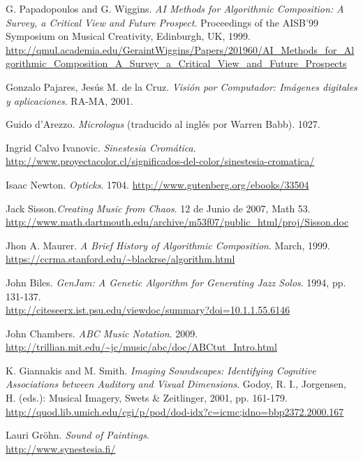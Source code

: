 \begin{thebibliography}{9}
 G. Papadopoulos and G. Wiggins. \emph{AI Methods for Algorithmic Composition: A Survey, a Critical View  and Future Prospect}. Proceedings of the AISB’99 Symposium on Musical Creativity, Edinburgh, UK, 1999.\\
 \url{http://qmul.academia.edu/GeraintWiggins/Papers/201960/AI_Methods_for_Algorithmic_Composition_A_Survey_a_Critical_View_and_Future_Prospects}

 Gonzalo Pajares, Jesús M. de la Cruz. \emph{Visión por Computador: Imágenes digitales y aplicaciones}. RA-MA, 2001.

 Guido d'Arezzo. \emph{Micrologus} (traducido al inglés por Warren Babb). 1027.

 Ingrid Calvo Ivanovic. \emph{Sinestesia Cromática}.
 \url{http://www.proyectacolor.cl/significados-del-color/sinestesia-cromatica/}

 Isaac Newton. \emph{Opticks}. 1704.
 \url{http://www.gutenberg.org/ebooks/33504}

Jack Sisson.\emph{Creating Music from Chaos}. 12 de Junio de 2007, Math 53.\\
\url{http://www.math.dartmouth.edu/archive/m53f07/public_html/proj/Sisson.doc}

 Jhon A. Maurer. \emph{A Brief History of Algorithmic Composition}. March, 1999.\\
 \url{https://ccrma.stanford.edu/~blackrse/algorithm.html}

 John Biles. \emph{GenJam: A Genetic Algorithm for Generating Jazz Solos}. 1994, pp. 131-137.\\
 \url{http://citeseerx.ist.psu.edu/viewdoc/summary?doi=10.1.1.55.6146}

  John Chambers. \emph{ABC Music Notation}. 2009.\\
  \url{http://trillian.mit.edu/~jc/music/abc/doc/ABCtut_Intro.html}
 
 K. Giannakis and M. Smith. \emph{Imaging Soundscapes: Identifying Cognitive Associations between Auditory and Visual Dimensions}. Godoy, R. I., Jorgensen, H. (eds.): Musical Imagery, Swets \& Zeitlinger, 2001, pp. 161-179.\\
 \url{http://quod.lib.umich.edu/cgi/p/pod/dod-idx?c=icmc;idno=bbp2372.2000.167}

Lauri Gröhn. \emph{Sound of Paintings}.\\
\url{http://www.synestesia.fi/}


\end{thebibliography}
